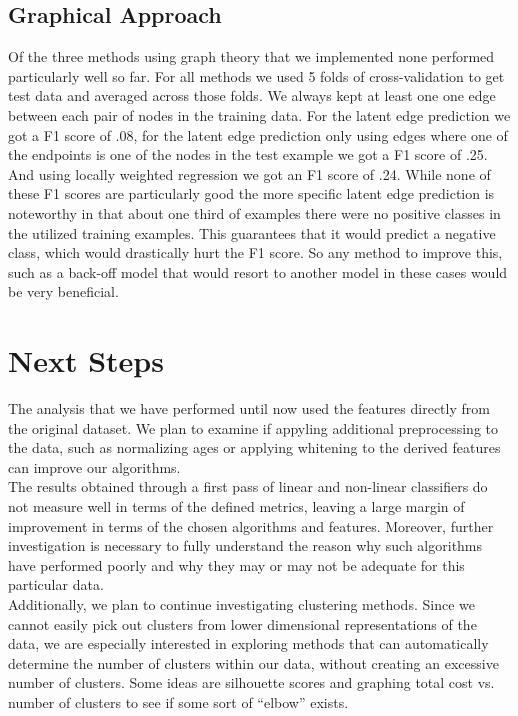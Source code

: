 \documentclass[twoside,twocolumn,paper=letter,fontsize=11pt]{article}
\begin{document}
\subsection{Graphical Approach}

Of the three methods using graph theory that we implemented none performed particularly well so far. For all methods we used 5 folds of cross-validation to get test data and averaged across those folds. We always kept at least one one edge between each pair of nodes in the training data. For the latent edge prediction we got a F1 score of .08, for the latent edge prediction only using edges where one of the endpoints is one of the nodes in the test example we got a F1 score of .25. And using locally weighted regression we got an F1 score of .24. While none of these F1 scores are particularly good the more specific latent edge prediction is noteworthy in that about one third of examples there were no positive classes in the utilized training examples. This guarantees that it would predict a negative class, which would drastically hurt the F1 score. So any method to improve this, such as a back-off model that would resort to another model in these cases would be very beneficial.
\section{Next Steps}

The analysis that we have performed until now used the features directly from
the original dataset. We plan to examine if appyling additional preprocessing to
the data, such as normalizing ages or applying whitening to the derived features
can improve our algorithms.\\

The results obtained through a first pass of linear and non-linear classifiers do not measure well in terms of the defined metrics, leaving a large margin of improvement in terms of the chosen algorithms and features. Moreover, further investigation is necessary to fully understand  the reason why such algorithms have performed poorly and why they may or may not be adequate for this particular data. \\

Additionally, we plan to continue investigating clustering methods. Since we
cannot easily pick out clusters from lower dimensional representations of the
data, we are especially interested in exploring methods that can automatically
determine the number of clusters within our data, without creating an excessive
number of clusters. Some ideas are silhouette scores and graphing total cost vs. number of clusters to see if some sort of ``elbow'' exists.
\end{document}
